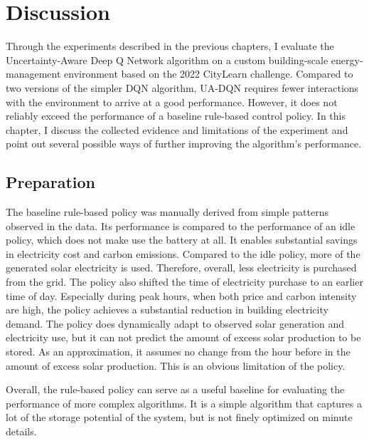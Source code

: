 
\chapter{Discussion}
  \label{Discussion}

Through the experiments described in the previous chapters, I evaluate the Uncertainty-Aware Deep Q Network algorithm on a custom building-scale energy-management environment based on the 2022 CityLearn challenge.
Compared to two versions of the simpler DQN algorithm, UA-DQN requires fewer interactions with the environment to arrive at a good performance.
However, it does not reliably exceed the performance of a baseline rule-based control policy.
In this chapter, I discuss the collected evidence and limitations of the experiment and point out several possible ways of further improving the algorithm's performance.

\section{Preparation}
The baseline rule-based policy was manually derived from simple patterns observed in the data.
Its performance is compared to the performance of an idle policy, which does not make use the battery at all.
It enables substantial savings in electricity cost and carbon emissions.
Compared to the idle policy, more of the generated solar electricity is used.
Therefore, overall, less electricity is purchased from the grid.
The policy also shifted the time of electricity purchase to an earlier time of day.
Especially during peak hours, when both price and carbon intensity are high, the policy achieves a substantial reduction in building electricity demand.
The policy does dynamically adapt to observed solar generation and electricity use, but it can not predict the amount of excess solar production to be stored.
As an approximation, it assumes no change from the hour before in the amount of excess solar production.
This is an obvious limitation of the policy.

Overall, the rule-based policy can serve as a useful baseline for evaluating the performance of more complex algorithms.
It is a simple algorithm that captures a lot of the storage potential of the system, but is not finely optimized on minute details.

